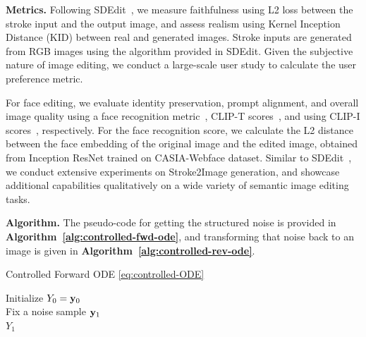 \documentclass{article} %
\theoremstyle{plain}
\begin{document}
\textbf{Metrics.} 
Following SDEdit~\citep{sdedit}, we measure faithfulness using L2 loss between the stroke input and the output image, and assess realism using Kernel Inception Distance (KID) between real and generated images. 
Stroke inputs are generated from RGB images using the algorithm provided in SDEdit.
Given the subjective nature of image editing, we conduct a large-scale user study to calculate the user preference metric. 

For face editing, we evaluate identity preservation, prompt alignment, and overall image quality using a face recognition metric~\citep{ruiz2024hyperdreambooth}, CLIP-T scores~\citep{clip}, and  using CLIP-I scores~\citep{clip}, respectively.
For the face recognition score, we calculate the L2 distance between the face embedding of the original image and the edited image, obtained from Inception ResNet trained on CASIA-Webface dataset.
Similar to SDEdit~\citep{sdedit}, we conduct extensive experiments on Stroke2Image generation, and showcase additional capabilities qualitatively on a wide variety of semantic image editing tasks. 


\textbf{Algorithm.}
The pseudo-code for getting the structured noise is provided in \textbf{Algorithm~\ref{alg:controlled-fwd-ode}}, and transforming that noise back to an image is given in \textbf{Algorithm~\ref{alg:controlled-rev-ode}}.



\begin{algorithm}[!t]
    \caption{Controlled Forward ODE \eqref{eq:controlled-ODE} }
    \label{alg:controlled-fwd-ode}
        Initialize $Y_0  = {\mathbf{y}}_0$\\
        Fix a noise sample ${\mathbf{y}}_1$\\
        \Return $Y_1$
\end{algorithm}
\end{document}
